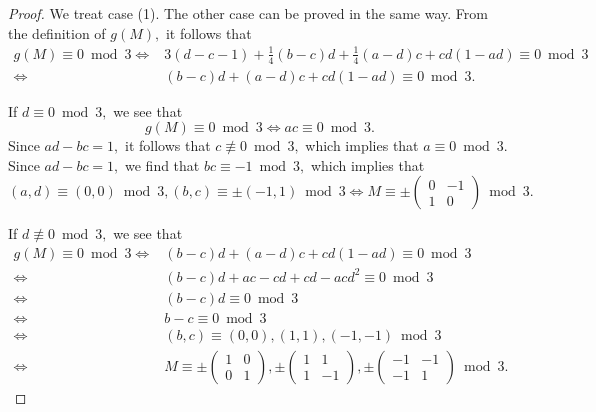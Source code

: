 \documentclass[12pt]{article}
\theoremstyle{definition}
\numberwithin{equation}{section}
\numberwithin{theorem}{section}
\begin{document}
\begin{proof}
We treat case (1). The other case can be proved in the same way. 
From the definition of $g(M),$ it follows that 
\begin{align*}
g(M)\equiv 0 \bmod{3}
\Longleftrightarrow&
3(d-c-1)+\frac14(b-c)d+\frac14(a-d)c+cd(1-ad)  \equiv 0 \bmod{3} \\
\Longleftrightarrow&
(b-c)d+(a-d)c+cd(1-ad) \equiv 0 \bmod{3}.
\end{align*}
\par
If $d\equiv 0\bmod{3},$ 
we see that  
\begin{equation*}
g(M)\equiv 0 \bmod{3} 
\Longleftrightarrow
ac\equiv 0 \bmod{3}.
\end{equation*}
Since $ad-bc=1,$ 
it follows that 
$
c 
\not\equiv 0 \bmod{3}, 
$ 
which implies that $a\equiv 0 \bmod{3}.$ 
Since $ad-bc=1,$ 
we find that 
$bc\equiv -1 \bmod{3},$ 
which implies that 
\begin{equation*}
(a,d)\equiv(0,0) \bmod{3}, 
(b,c)\equiv \pm (-1,1) \bmod{3}
\Longleftrightarrow
M
\equiv 
\pm
\begin{pmatrix}
0 & -1 \\
1 & 0
\end{pmatrix}
\bmod{3}.
\end{equation*}
\par
If $d \not\equiv 0 \bmod{3},$ 
we see that 
\begin{align*}
g(M)\equiv 0 \bmod{3}
\Longleftrightarrow&
(b-c)d+(a-d)c+cd(1-ad) \equiv 0 \bmod{3} \\
\Longleftrightarrow&
(b-c)d
+
ac-cd+cd-acd^2 \equiv 0 \bmod{3}  \\
\Longleftrightarrow&
(b-c)d\equiv 0 \bmod{3} \\
\Longleftrightarrow&
b-c\equiv 0 \bmod{3} \\
\Longleftrightarrow&
(b,c)\equiv (0,0), (1,1), (-1,-1) \bmod{3} \\
\Longleftrightarrow&
M
\equiv 
\pm
\begin{pmatrix}
1 & 0 \\
0 & 1
\end{pmatrix}, 
\pm
\begin{pmatrix}
1 & 1 \\
1 & -1
\end{pmatrix}, 
\pm
\begin{pmatrix}
-1 & -1 \\
-1 & 1
\end{pmatrix} 
\bmod{3}. 
\end{align*}
\end{proof}
\end{document}
